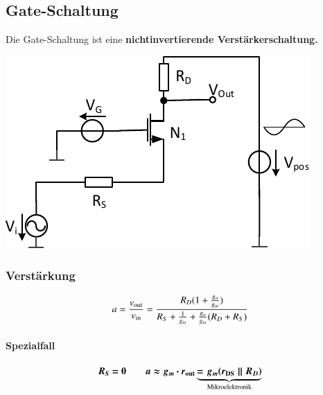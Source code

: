 \subsection{Gate-Schaltung}

Die Gate-Schaltung ist eine \textbf{nichtinvertierende Verstärkerschaltung.}

\smallskip

\begin{minipage}[t]{0.4\columnwidth}
    \includegraphics[width=\columnwidth, align=t]{images/03_gate_schaltung.pdf}
\end{minipage}
\hfill
\begin{minipage}[t]{0.58\columnwidth}
    \subsubsection{Verstärkung}

    \vspace{-0.2cm}

    \[
        a = \frac{v_{\rm out}}{v_{\rm in}} = \frac{R_D (1+\frac{g_o}{g_m})}{R_S + \frac{1}{g_m} + \frac{g_o}{g_m} (R_D + R_S)}
    \]

    \paragraph{Spezialfall}
    
    \vspace{-0.5cm}

    \[
        \bm{R_S = 0 \qquad  a \approx g_m \cdot r_{\rm out} \underbrace{= g_m (r_{\rm DS} \parallel R_D) }_{\text{Mikroelektronik}} }
    \]
\end{minipage}

\smallskip


